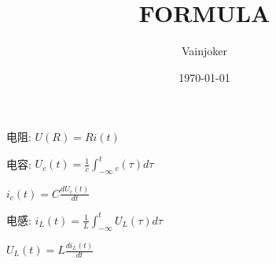 \documentclass{article}
\title{FORMULA}
\author{Vainjoker}
\date{\today}
\begin{document}
    \maketitle
    \newpage
    
    电阻: $U(R)=Ri(t)$

    电容: $U_c(t)=\frac{1}{c}\int_{-\infty}^{t}_{c}(\tau)d\tau$

    $i_{c}(t)=C\frac{dU_{c}(t)}{dt}$

    电感: $i_{L}(t)=\frac{1}{L}\int _{-\infty}^{t}U_{L}(\tau)d\tau$

    $U_{L}(t)=L\frac{di_{L}(t)}{dt}$
\end{document}
